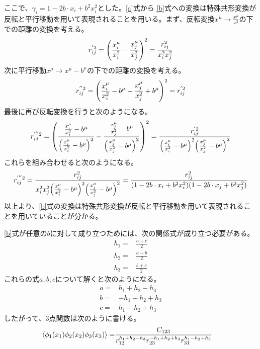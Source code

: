 \documentclass[11pt, dvipdfmx]{article}
\numberwithin{equation}{section}
\newcommand{\blankline}{\par\vspace{\baselineskip}} %
\begin{document}
ここで、$\gamma_i=1-2b\cdot x_i + b^2 x_i^2$とした。\eqref{a}式から
\eqref{b}式への変換は特殊共形変換が反転と平行移動を用いて表現されることを用いる。まず、反転変換$x^\mu \rightarrow \frac{x^\mu}{x^2}$の下での距離の変換を考える。
\begin{align}
    r_{ij}^{'2}=\qty(\frac{x_i^\mu}{x_i^2}-\frac{x_j^\mu}{x_j^2})^2=\frac{r_{ij}^2}{x_i^2 x_j^2}
\end{align}
次に平行移動$x^\mu \rightarrow x^\mu - b^\mu$の下での距離の変換を考える。
\begin{align}
    r_{ij}^{''2}=\qty(\frac{x_i^\mu}{x_i^2}-b^\mu - \frac{x_j^\mu}{x_j^2}+b^\mu)^2=r_{ij}^{'2}
\end{align}
最後に再び反転変換を行うと次のようになる。
\begin{align}
    r_{ij}^{'''2}=\qty(\frac{\frac{x_i^\mu}{x_i^2}-b^\mu}{\qty(\frac{x_i^\mu}{x_i^2}-b^\mu)^2}-\frac{\frac{x_j^\mu}{x_j^2}-b^\mu}{\qty(\frac{x_j^\mu}{x_j^2}-b^\mu)^2})^2=\frac{r_{ij}^{'2}}{\qty(\frac{x_i^\mu}{x_i^2}-b^\mu)^2\qty(\frac{x_j^\mu}{x_j^2}-b^\mu)^2}
\end{align}
これらを組み合わせると次のようになる。
\begin{align}
    r_{ij}^{'''2}=\frac{r_{ij}^2}{x_i^2 x_j^2 \qty(\frac{x_i^\mu}{x_i^2}-b^\mu)^2\qty(\frac{x_j^\mu}{x_j^2}-b^\mu)^2}=\frac{r_{ij}^2}{(1-2b\cdot x_i + b^2 x_i^2)(1-2b\cdot x_j + b^2 x_j^2)}
\end{align}
以上より、\eqref{b}式の変換は特殊共形変換が反転と平行移動を用いて表現されることを用いていることが分かる。
\blankline
\eqref{b}式が任意の$b$に対して成り立つためには、次の関係式が成り立つ必要がある。
\begin{align}
    h_1=&\frac{a+c}{2}\\
    h_2=&\frac{a+b}{2}\\
    h_3=&\frac{b+c}{2}
\end{align}
これらの式$a,b,c$について解くと次のようになる。
\begin{align}
    a=&h_1 + h_2 - h_3\\
    b=&-h_1 + h_2 + h_3\\
    c=&h_1 - h_2 + h_3
\end{align}
したがって、3点関数は次のように書ける。
\begin{align}
    \ev{\phi_1(x_1)\phi_2(x_2)\phi_3(x_3)}=&\frac{C_{123}}{r_{12}^{h_1 + h_2 - h_3}r_{23}^{-h_1 + h_2 + h_3}r_{31}^{h_1 - h_2 + h_3}}
\end{align}
\end{document}
